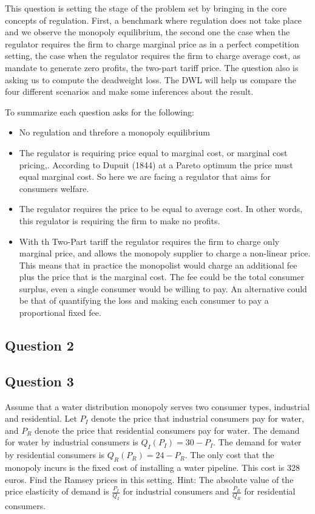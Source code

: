 \documentclass[11pt]{article} %
\begin{document}
This question is setting the stage of the problem set by bringing in the core concepts of regulation. First, a benchmark where regulation does not take place and we observe the monopoly equilibrium, the second one the case when the regulator requires the firm to charge marginal price as in a perfect competition setting, the case when the regulator requires the firm to charge average cost, as mandate to generate zero profits, the two-part tariff price. The question also is asking us to compute the deadweight loss. The DWL will help us compare the four different scenarios and make some inferences about the result.

To summarize each question asks for the following:

\begin{itemize}
	\item No regulation and threfore a monopoly equilibrium
	\item The regulator is requiring price equal to marginal cost, or marginal cost pricing,. According to Dupuit (1844) at a Pareto optimum the price must equal marginal cost. So here we are facing a regulator that aims for consumers welfare.
	\item The regulator requires the price to be equal to average cost. In other words, this regulator is requiring the firm to make no profits.
	\item With th Two-Part tariff the regulator requires the firm to charge only marginal price, and allows the monopoly supplier to charge a non-linear price. This means that in practice the monopolist would charge an additional fee plus the price that is the marginal cost. The fee could be the total consumer surplus, even a single consumer would be willing to pay. An alternative could be that of quantifying the loss and making each consumer to pay a proportional fixed fee.
\end{itemize}



\subsection{Question 2}


\subsection{Question 3}  Assume that a water distribution monopoly serves two consumer types, industrial and residential. Let $P_I$ denote the price that industrial consumers pay for water, and $P_R$ denote the price that residential consumers pay for water. The demand for water by industrial consumers is $Q_{I}(P_{I})= 30 -P_I$. The demand for water by residential consumers is $Q_{R}(P_{R})=24-P_R$. The only cost that the monopoly incurs is the fixed cost of installing a water pipeline. This cost is 328 euros. Find the Ramsey prices in this setting. Hint: The absolute value of the price elasticity of demand is $\frac{P_I}{Q_I}$ for industrial consumers and $\frac{P_R}{Q_R}$ for residential consumers.
\end{document}
